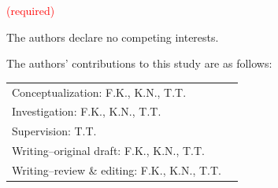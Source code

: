 \documentclass[dvipdfmx]{nolta}        %
\begin{document}
\funding
\textcolor{red}{(required)}

\conflictsofinterest
The authors declare no competing interests.

\authorcontribution
The authors’ contributions to this study are as follows:

\begin{tabular}{ll}
Conceptualization: F.K., K.N., T.T.\\
Investigation: F.K., K.N., T.T.\\
Supervision: T.T.\\
Writing--original draft: F.K., K.N., T.T.\\
Writing--review \& editing: F.K., K.N., T.T.\\
\end{tabular}





\end{document}
